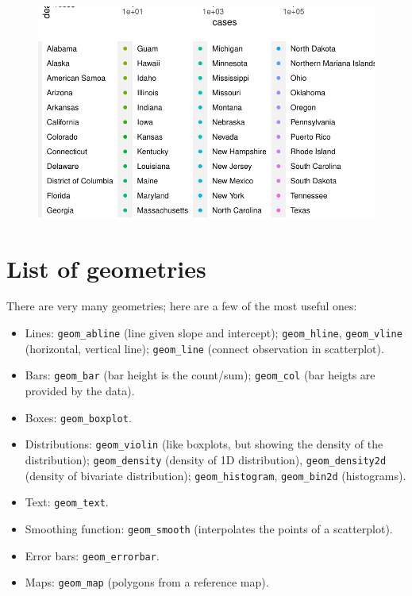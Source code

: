 \documentclass[
  letterpaper,
  DIV=11,
  numbers=noendperiod]{scrreprt}
\providecommand{\tightlist}{%
  \setlength{\itemsep}{0pt}\setlength{\parskip}{0pt}}\usepackage{longtable,booktabs,array}
\begin{document}
\begin{figure}[H]

{\centering \includegraphics{./01-dataviz_files/figure-pdf/unnamed-chunk-20-1.pdf}

}

\end{figure}

\hypertarget{list-of-geometries}{%
\section{List of geometries}\label{list-of-geometries}}

There are very many geometries; here are a few of the most useful ones:

\begin{itemize}
\tightlist
\item
  Lines: \texttt{geom\_abline} (line given slope and intercept);
  \texttt{geom\_hline}, \texttt{geom\_vline} (horizontal, vertical
  line); \texttt{geom\_line} (connect observation in scatterplot).
\item
  Bars: \texttt{geom\_bar} (bar height is the count/sum);
  \texttt{geom\_col} (bar heigts are provided by the data).
\item
  Boxes: \texttt{geom\_boxplot}.
\item
  Distributions: \texttt{geom\_violin} (like boxplots, but showing the
  density of the distribution); \texttt{geom\_density} (density of 1D
  distribution), \texttt{geom\_density2d} (density of bivariate
  distribution); \texttt{geom\_histogram}, \texttt{geom\_bin2d}
  (histograms).
\item
  Text: \texttt{geom\_text}.
\item
  Smoothing function: \texttt{geom\_smooth} (interpolates the points of
  a scatterplot).
\item
  Error bars: \texttt{geom\_errorbar}.
\item
  Maps: \texttt{geom\_map} (polygons from a reference map).
\end{itemize}
\end{document}
